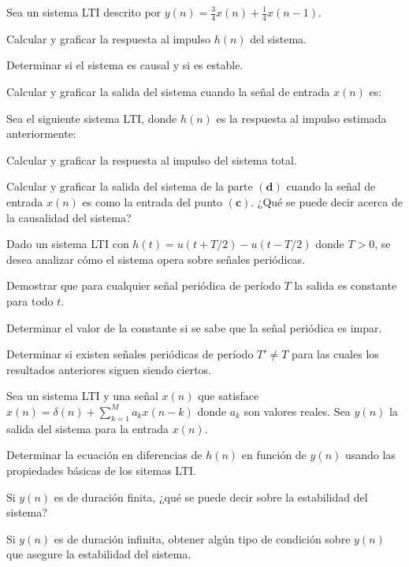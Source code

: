 \begin{ejercicio}
    Sea un sistema LTI descrito por $y(n) = \frac{3}{4} x(n) + \frac{1}{4} x(n-1)$.

    \inciso Calcular y graficar la respuesta al impulso $h(n)$ del sistema.

    \inciso Determinar si el sistema es causal y si es estable.

    \inciso Calcular y graficar la salida del sistema cuando la señal de entrada $x(n)$ es:
    \begin{center}
        
    \end{center}

    \inciso Sea el siguiente sistema LTI, donde $h(n)$ es la respuesta al impulso estimada anteriormente:
    \begin{center}
        
    \end{center}
    Calcular y graficar la respuesta al impulso del sistema total.

    \inciso Calcular y graficar la salida del sistema de la parte $(\mathbf{d})$ cuando la señal de entrada $x(n)$ es como la entrada del punto $(\mathbf{c})$. ¿Qué se puede decir acerca de la causalidad del sistema?
\end{ejercicio}

\begin{ejercicio}
    Dado un sistema LTI con $h(t) = u(t + T/2) - u(t - T/2)$ donde $T>0$, se desea analizar cómo el sistema opera sobre señales periódicas.
    
    \inciso Demostrar que para cualquier señal periódica de período $T$ la salida es constante para todo $t$.

    \inciso Determinar el valor de la constante si se sabe que la señal periódica es impar.

    \inciso Determinar si existen señales periódicas de período $T'\neq T$ para las cuales los resultados anteriores siguen siendo ciertos.
\end{ejercicio}

\begin{ejercicio}
    Sea un sistema LTI y una señal $x(n)$ que satisface $x(n)=\delta(n) + \sum_{k=1}^M a_k x(n-k)$ donde $a_k$ son valores reales. Sea $y(n)$ la salida del sistema para la entrada $x(n)$.

    \inciso Determinar la ecuación en diferencias de $h(n)$ en función de $y(n)$ usando las propiedades básicas de los sitemas LTI.
    
    \inciso Si $y(n)$ es de duración finita, ¿qué se puede decir sobre la estabilidad del sistema?

    \inciso Si $y(n)$ es de duración infinita, obtener algún tipo de condición sobre $y(n)$ que asegure la estabilidad del sistema.
\end{ejercicio}
    
    
    